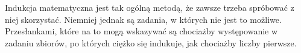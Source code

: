\vspace{10px}

\noindent
Indukcja matematyczna jest tak ogólną metodą, że zawsze trzeba spróbować z niej skorzystać. Niemniej jednak są zadania, w których nie jest to możliwe. Przesłankami, które na to mogą wskazywać są chociażby występowanie w zadaniu zbiorów, po których ciężko się indukuje, jak chociażby liczby pierwsze. 

\vspace{10px}

